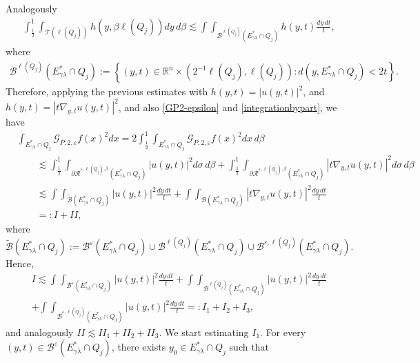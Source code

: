 \documentclass[11pt, a4paper,leqno]{amsart}
\theoremstyle{plain}
\theoremstyle{definition}
\theoremstyle{remark}
\numberwithin{equation}{section}
\def \Gcal { \mathcal{G} }
\def \iint{\int\!\!\!\int}
\begin{document}
Analogously
\begin{align*}
\int_{\frac{1}{2}}^1
\int_{\mathcal{T}(\ell(Q_j))}h(y,\beta \ell(Q_j))dy\,d\beta
\lesssim
 \iint_{\mathcal{B}^{\ell(Q_j)}(E^*_{\gamma\lambda}\cap Q_j)}h(y,t)\frac{dy\,dt}{t},
\end{align*}
where
\begin{align*}
\mathcal{B}^{\ell(Q_j)}(E^*_{\gamma\lambda}\cap Q_j):=\left\{(y,t)\in \mathbb{R}^n\times (2^{-1}\ell(Q_j),\ell(Q_j)) : d(y,E^*_{\gamma\lambda}\cap Q_j)<2t\right\}.
\end{align*}
Therefore, applying the previous estimates with  $h(y,t)=|u(y,t)|^2$,
and $h(y,t)=|t\nabla_{y,t}u(y,t)|^2$, and also \eqref{GP2-epsilon} and \eqref{integrationbypart}, we have
\begin{align}\label{below}
&\int_{E^*_{\gamma\lambda}\cap Q_j}\Gcal_{P,2,\varepsilon}f(x)^2dx
=2\int_{\frac{1}{2}}^1
\int_{E^*_{\gamma\lambda}\cap Q_j}\Gcal_{P,2,\varepsilon}f(x)^2dx\,d\beta
\\\nonumber&\qquad
\lesssim 
\int_{\frac{1}{2}}^1
\int_{\partial \mathcal{R}^{\varepsilon,\ell(Q_j),\beta}(E^*_{\gamma\lambda}\cap Q_j)}|u(y,t)|^2d\sigma\,d\beta
+ \int_{\frac{1}{2}}^1\int_{\partial \mathcal{R}^{\varepsilon,\ell(Q_j),\beta}(E^*_{\gamma\lambda}\cap Q_j)}|t\nabla_{y,t}u(y,t)|^2 d\sigma\,d\beta
\\\nonumber&\qquad
\lesssim 
\iint_{\widetilde{\mathcal{B}}(E^*_{\gamma\lambda}\cap Q_j)}|u(y,t)|^2\frac{dy\,dt}{t}
+ \iint_{\widetilde{\mathcal{B}}(E^*_{\gamma\lambda}\cap Q_j)}|t\nabla_{y,t}u(y,t)|^2 \frac{dy\,dt}{t}
\\\nonumber&\qquad
=:I+II,
\end{align}
where
$$
\widetilde{\mathcal{B}}(E^*_{\gamma\lambda}\cap Q_j):=
\mathcal{B}^{\varepsilon}(E^*_{\gamma\lambda}\cap Q_j)
\cup
\mathcal{B}^{\ell(Q_j)}(E^*_{\gamma\lambda}\cap Q_j)
\cup
\mathcal{B}^{\varepsilon,\ell(Q_j)}(E^*_{\gamma\lambda}\cap Q_j).
$$
Hence,
\begin{multline*}
I\lesssim \iint_{\mathcal{B}^{\varepsilon}(E^*_{\gamma\lambda}\cap Q_j)}|u(y,t)|^2\frac{dy \, dt}{t}
+\iint_{\mathcal{B}^{\ell(Q_j)}(E^*_{\gamma\lambda}\cap Q_j)}|u(y,t)|^2\frac{dy \, dt}{t}
\\
+
\iint_{\mathcal{B}^{\varepsilon,\ell(Q_j)}(E^*_{\gamma\lambda}\cap Q_j)}|u(y,t)|^2\frac{dy \, dt}{t}
=:I_1+I_2+I_3,
\end{multline*}
and analogously $II\lesssim II_1+II_2+II_3.$
We start estimating $I_1$. For every $(y,t)\in \mathcal{B}^{\varepsilon}(E^*_{\gamma\lambda}\cap Q_j)$, there exists $y_0\in E^*_{\gamma\lambda}\cap Q_j$ such that
\end{document}
